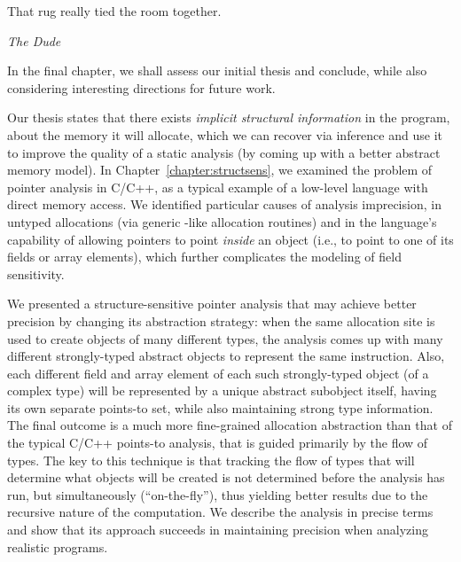 \label{chapter:conclusions}
\epigraph{That rug really tied the room together.}{\textit{The Dude}}

In the final chapter, we shall assess our initial thesis and conclude,
while also considering interesting directions for future work.

Our thesis states that there exists \emph{implicit structural
  information} in the program, about the memory it will allocate,
which we can recover via inference and use it to improve the quality
of a static analysis (by coming up with a better abstract memory
model). In Chapter~\ref{chapter:structsens}, we examined the problem
of pointer analysis in C/C++, as a typical example of a low-level
language with direct memory access. We identified particular causes of
analysis imprecision, in untyped allocations (via generic
-like allocation routines) and in the language's
capability of allowing pointers to point \emph{inside} an object
(i.e., to point to one of its fields or array elements), which further
complicates the modeling of field sensitivity.


We presented a structure-sensitive pointer analysis that may achieve
better precision by changing its abstraction strategy: when the same
allocation site is used to create objects of many different types, the
analysis comes up with many different strongly-typed abstract objects
to represent the same instruction. Also, each different field and
array element of each such strongly-typed object (of a complex type)
will be represented by a unique abstract subobject itself, having its
own separate points-to set, while also maintaining strong type
information. The final outcome is a much more fine-grained allocation
abstraction than that of the typical C/C++ points-to analysis, that is
guided primarily by the flow of types. The key to this technique is
that tracking the flow of types that will determine what objects will
be created is not determined before the analysis has run, but
simultaneously (``on-the-fly''), thus yielding better results due to
the recursive nature of the computation. We describe the analysis in
precise terms and show that its approach succeeds in maintaining
precision when analyzing realistic programs.

